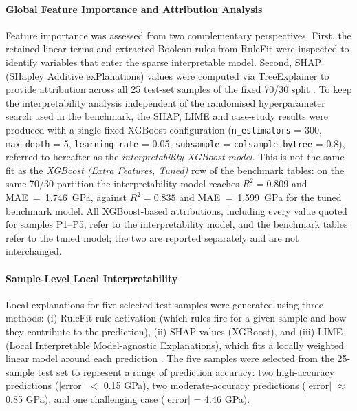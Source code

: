 \documentclass[pdflatex,sn-mathphys-num]{sn-jnl}%
\newif\ifrevmarks%
\newcommand{\revmark}[1]{\ifrevmarks\textcolor{revblue}{#1}\else#1\fi}%
\theoremstyle{thmstyleone}%
\theoremstyle{thmstyletwo}%
\theoremstyle{thmstylethree}%
\begin{document}
\paragraph{Global Feature Importance and Attribution Analysis}
\revmark{Feature importance was assessed from two complementary perspectives. First, the retained linear terms and extracted Boolean rules from RuleFit were inspected to identify variables that enter the sparse interpretable model. Second, SHAP (SHapley Additive exPlanations) values were computed via TreeExplainer to provide attribution across all 25 test-set samples of the fixed 70/30 split \cite{lundberg2017unified}. To keep the interpretability analysis independent of the randomised hyperparameter search used in the benchmark, the SHAP, LIME and case-study results were produced with a single fixed XGBoost configuration (\texttt{n\_estimators} = 300, \texttt{max\_depth} = 5, \texttt{learning\_rate} = 0.05, \texttt{subsample} = \texttt{colsample\_bytree} = 0.8), referred to hereafter as the \textit{interpretability XGBoost model}. This is not the same fit as the \textit{XGBoost (Extra Features, Tuned)} row of the benchmark tables: on the same 70/30 partition the interpretability model reaches $R^2 = 0.809$ and MAE~=~1.746~GPa, against $R^2 = 0.835$ and MAE~=~1.599~GPa for the tuned benchmark model. All XGBoost-based attributions, including every value quoted for samples P1--P5, refer to the interpretability model, and the benchmark tables refer to the tuned model; the two are reported separately and are not interchanged.}

\paragraph{Sample-Level Local Interpretability}
Local explanations for five selected test samples were generated using three methods: (i) RuleFit rule activation (which rules fire for a given sample and how they contribute to the prediction), (ii) SHAP values (XGBoost), and (iii) LIME (Local Interpretable Model-agnostic Explanations), which fits a locally weighted linear model around each prediction \cite{ribeiro2016should}. The five samples were selected from the 25-sample test set to represent a range of prediction accuracy: two high-accuracy predictions ($|$error$|$ $<$ 0.15 GPa), two moderate-accuracy predictions ($|$error$|$ $\approx$ 0.85 GPa), and one challenging case ($|$error$|$ = 4.46 GPa).
\end{document}
